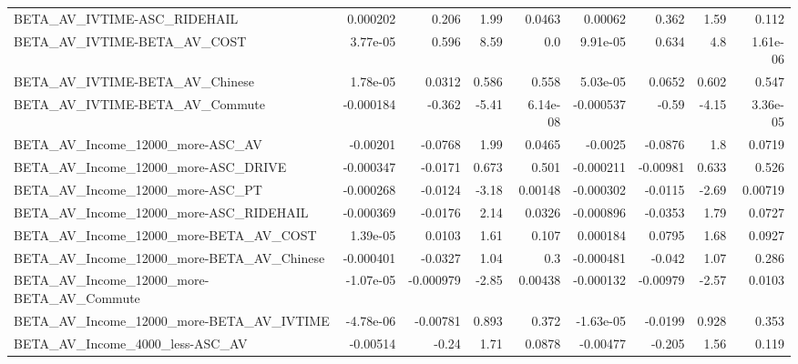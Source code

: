 \begin{tabular}{lrrrrrrrr}
BETA\_AV\_IVTIME-ASC\_RIDEHAIL                        &    0.000202 &        0.206 &     1.99 &   0.0463 &    0.00062 &       0.362 &         1.59 &         0.112 \\
BETA\_AV\_IVTIME-BETA\_AV\_COST                        &    3.77e-05 &        0.596 &     8.59 &      0.0 &   9.91e-05 &       0.634 &          4.8 &      1.61e-06 \\
BETA\_AV\_IVTIME-BETA\_AV\_Chinese                     &    1.78e-05 &       0.0312 &    0.586 &    0.558 &   5.03e-05 &      0.0652 &        0.602 &         0.547 \\
BETA\_AV\_IVTIME-BETA\_AV\_Commute                     &   -0.000184 &       -0.362 &    -5.41 & 6.14e-08 &  -0.000537 &       -0.59 &        -4.15 &      3.36e-05 \\
BETA\_AV\_Income\_12000\_more-ASC\_AV                   &    -0.00201 &      -0.0768 &     1.99 &   0.0465 &    -0.0025 &     -0.0876 &          1.8 &        0.0719 \\
BETA\_AV\_Income\_12000\_more-ASC\_DRIVE                &   -0.000347 &      -0.0171 &    0.673 &    0.501 &  -0.000211 &    -0.00981 &        0.633 &         0.526 \\
BETA\_AV\_Income\_12000\_more-ASC\_PT                   &   -0.000268 &      -0.0124 &    -3.18 &  0.00148 &  -0.000302 &     -0.0115 &        -2.69 &       0.00719 \\
BETA\_AV\_Income\_12000\_more-ASC\_RIDEHAIL             &   -0.000369 &      -0.0176 &     2.14 &   0.0326 &  -0.000896 &     -0.0353 &         1.79 &        0.0727 \\
BETA\_AV\_Income\_12000\_more-BETA\_AV\_COST             &    1.39e-05 &       0.0103 &     1.61 &    0.107 &   0.000184 &      0.0795 &         1.68 &        0.0927 \\
BETA\_AV\_Income\_12000\_more-BETA\_AV\_Chinese          &   -0.000401 &      -0.0327 &     1.04 &      0.3 &  -0.000481 &      -0.042 &         1.07 &         0.286 \\
BETA\_AV\_Income\_12000\_more-BETA\_AV\_Commute          &   -1.07e-05 &    -0.000979 &    -2.85 &  0.00438 &  -0.000132 &    -0.00979 &        -2.57 &        0.0103 \\
BETA\_AV\_Income\_12000\_more-BETA\_AV\_IVTIME           &   -4.78e-06 &     -0.00781 &    0.893 &    0.372 &  -1.63e-05 &     -0.0199 &        0.928 &         0.353 \\
BETA\_AV\_Income\_4000\_less-ASC\_AV                    &    -0.00514 &        -0.24 &     1.71 &   0.0878 &   -0.00477 &      -0.205 &         1.56 &         0.119 \\

\end{tabular}
